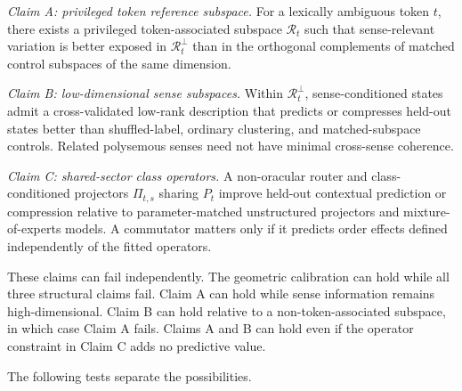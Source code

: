 \documentclass[
  aps,
  reprint,
  superscriptaddress,
  floatfix,
  nofootinbib,
  longbibliography
]{revtex4-2}
\begin{document}
\emph{Claim A: privileged token reference subspace.}
For a lexically ambiguous token $t$, there exists a privileged token-associated
subspace $\mathcal R_t$ such that sense-relevant variation is better
exposed in $\mathcal R_t^\perp$ than in the orthogonal complements of
matched control subspaces of the same dimension.

\emph{Claim B: low-dimensional sense subspaces.}
Within $\mathcal R_t^\perp$, sense-conditioned states admit a cross-validated
low-rank description that predicts or compresses held-out states better than
shuffled-label, ordinary clustering, and matched-subspace controls.  Related
polysemous senses need not have minimal cross-sense coherence.

\emph{Claim C: shared-sector class operators.}
A non-oracular router and class-conditioned projectors $\Pi_{t,s}$ sharing $P_t$ improve
held-out contextual prediction or compression relative to parameter-matched
unstructured projectors and mixture-of-experts models.  A commutator matters
only if it predicts order effects defined independently of the fitted
operators.

These claims can fail independently.  The geometric calibration can hold while all
three structural claims fail.  Claim A can hold while sense information
remains high-dimensional.  Claim B can hold relative to a non-token-associated
subspace, in which case Claim A fails.  Claims A and B can hold even if the
operator constraint in Claim C adds no predictive value.

The following tests separate the possibilities.
\end{document}
